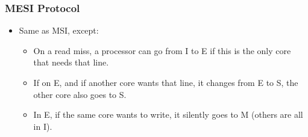 \documentclass[10pt]{article}
\begin{document}
\subsubsection*{MESI Protocol}
\begin{itemize}
    \item Same as MSI, except:
    \begin{itemize}
        \item On a read miss, a processor can go from I to E if this is the only core that needs that line.
        \item If on E, and if another core wants that line, it changes from E to S, the other core also goes to S.
        \item In E, if the same core wants to write, it silently goes to M (others are all in I).
    \end{itemize}
\end{itemize}
\end{document}
